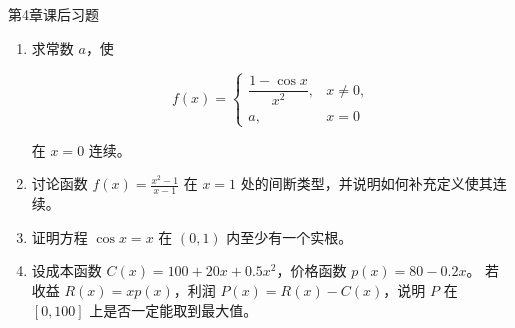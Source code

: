 \documentclass[aspectratio=169,10pt,fontset=fandol]{ctexbeamer}
\begin{document}
\begin{frame}[t,fragile]{第4章课后习题}
\normalsize
{\normalsize
\begin{enumerate}[label=\textbf{练习\arabic*.},leftmargin=2.2em]

\item 求常数 $a$，使

\[

f(x)=

\begin{cases}

\dfrac{1-\cos x}{x^2},&x\neq0,\\

a,&x=0

\end{cases}

\]

在 $x=0$ 连续。

\item 讨论函数 $f(x)=\frac{x^2-1}{x-1}$ 在 $x=1$ 处的间断类型，并说明如何补充定义使其连续。

\item 证明方程 $\cos x=x$ 在 $(0,1)$ 内至少有一个实根。

\item 设成本函数 $C(x)=100+20x+0.5x^2$，价格函数 $p(x)=80-0.2x$。 若收益 $R(x)=xp(x)$，利润 $P(x)=R(x)-C(x)$，说明 $P$ 在 $[0,100]$ 上是否一定能取到最大值。

\end{enumerate}
}
\end{frame}
\end{document}
